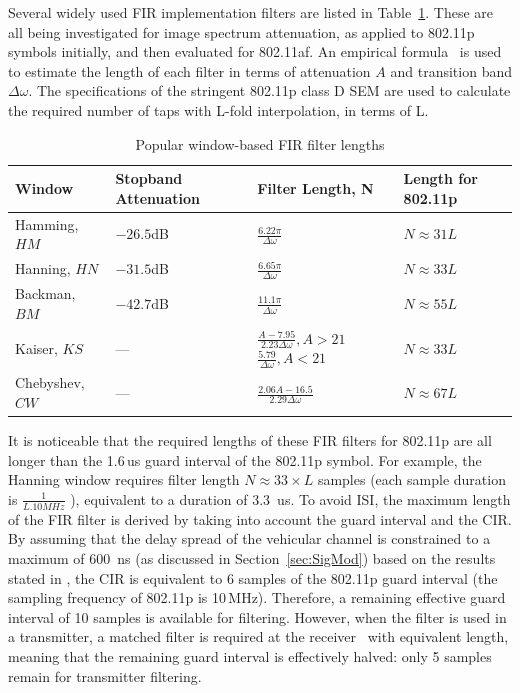 Several widely used FIR implementation filters are listed in Table~\ref{tab:lengthFIR}. These are all being investigated for image spectrum attenuation, as applied to 802.11p symbols initially, and then evaluated for 802.11af.
An empirical formula~\cite{Kapadia2012} is used to estimate the length of each filter in terms of attenuation $A$ and transition band $\Delta\omega$.
The specifications of the stringent 802.11p class D SEM are used to calculate the required number of taps with L-fold interpolation, in terms of L.

\begin{table}[h]
	\centering
	\caption{Popular window-based FIR filter lengths}
	\label{tab:lengthFIR}
	\renewcommand{\arraystretch}{1.5}
	\begin{tabular}{@{}lp{2cm}p{3.4cm}p{2.5cm}@{}}
       \toprule
    		  Window 	& Stopband Attenuation  & Filter Length, N   & Length for 802.11p\\
    	\midrule
		Hamming, 	$HM$		& $-26.5$dB	& $\frac{6.22\pi}{\Delta\omega}$							&  $N \approx 31 L$ \\
		Hanning, $HN$				& $-31.5$dB	& $\frac{6.65\pi}{\Delta\omega}$							&  $N \approx 33 L$ \\
		Backman, $BM$			& $-42.7$dB	& $\frac{11.1\pi}{\Delta\omega}$							&  $N \approx 55 L$ \\
[1ex]		Kaiser, $KS$				& --- 		&\parbox{3cm}{	$\frac{A-7.95}{2.23 \Delta\omega}, A>21$ \\
[1ex]												$\frac{5.79}{\Delta\omega}, A<21$}			& $N \approx 33 L$ \\
[1ex]		Chebyshev, $CW$		      & ---		& $\frac{2.06A -16.5}{2.29 \Delta\omega}$					& $N \approx 67 L$ \\
    	\bottomrule
    \end{tabular}
\end{table}

It is noticeable that the required lengths of these FIR filters for 802.11p are all longer than the 1.6\,us guard interval of the 802.11p symbol.
For example, the Hanning window requires filter length $N \approx 33\times L$ samples (each sample duration is $\frac{1}{L.10MHz}$ ), equivalent to a duration of 3.3~us.
To avoid ISI, the maximum length of the FIR filter is derived by taking into account the guard interval and the CIR.
By assuming that the delay spread of the vehicular channel is constrained to a maximum of 600~ns (as discussed in Section~\ref{sec:SigMod}) based on the results stated in \cite{Acosta-Marum2007,Sen2008}, the CIR is equivalent to 6 samples of the 802.11p guard interval (the sampling frequency of 802.11p is 10\,MHz).
Therefore, a remaining effective guard interval of 10 samples is available for filtering.
However, when the filter is used in a transmitter, a matched filter is required at the receiver~\cite{farhang2008signal} with equivalent length, meaning that the remaining guard interval is effectively halved: only 5 samples remain for transmitter filtering.

